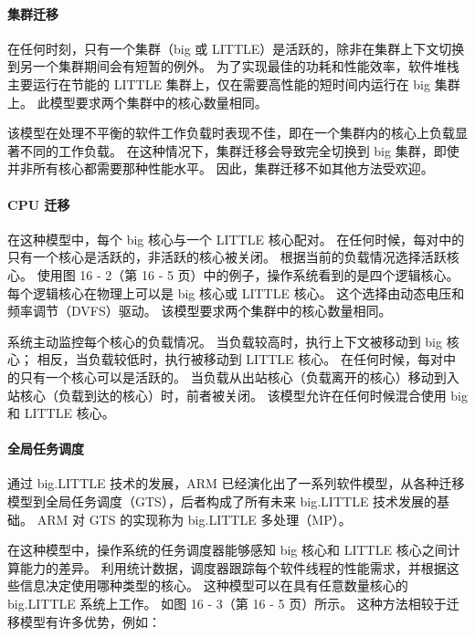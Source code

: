\paragraph*{集群迁移}

在任何时刻，只有一个集群（big 或 LITTLE）是活跃的，除非在集群上下文切换到另一个集群期间会有短暂的例外。
为了实现最佳的功耗和性能效率，软件堆栈主要运行在节能的 LITTLE 集群上，仅在需要高性能的短时间内运行在 big 集群上。
此模型要求两个集群中的核心数量相同。

该模型在处理不平衡的软件工作负载时表现不佳，即在一个集群内的核心上负载显著不同的工作负载。
在这种情况下，集群迁移会导致完全切换到 big 集群，即使并非所有核心都需要那种性能水平。
因此，集群迁移不如其他方法受欢迎。

\paragraph*{CPU 迁移}

在这种模型中，每个 big 核心与一个 LITTLE 核心配对。
在任何时候，每对中的只有一个核心是活跃的，非活跃的核心被关闭。
根据当前的负载情况选择活跃核心。
使用图 16 - 2（第 16 - 5 页）中的例子，操作系统看到的是四个逻辑核心。
每个逻辑核心在物理上可以是 big 核心或 LITTLE 核心。
这个选择由动态电压和频率调节（DVFS）驱动。
该模型要求两个集群中的核心数量相同。


系统主动监控每个核心的负载情况。
当负载较高时，执行上下文被移动到 big 核心；
相反，当负载较低时，执行被移动到 LITTLE 核心。
在任何时候，每对中的只有一个核心可以是活跃的。
当负载从出站核心（负载离开的核心）移动到入站核心（负载到达的核心）时，前者被关闭。
该模型允许在任何时候混合使用 big 和 LITTLE 核心。

\paragraph*{全局任务调度}\label{sec:global-task-sched}

通过 big.LITTLE 技术的发展，ARM 已经演化出了一系列软件模型，从各种迁移模型到全局任务调度（GTS），后者构成了所有未来 big.LITTLE 技术发展的基础。
ARM 对 GTS 的实现称为 big.LITTLE 多处理（MP）。

在这种模型中，操作系统的任务调度器能够感知 big 核心和 LITTLE 核心之间计算能力的差异。
利用统计数据，调度器跟踪每个软件线程的性能需求，并根据这些信息决定使用哪种类型的核心。
这种模型可以在具有任意数量核心的 big.LITTLE 系统上工作。
如图 16 - 3（第 16 - 5 页）所示。
这种方法相较于迁移模型有许多优势，例如：

